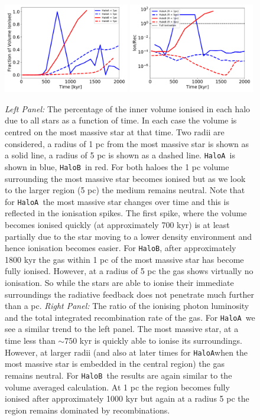 \documentclass[graphics, twocolumn, usenatbib]{mn2e}
\newcommand{\ha} {\texttt{HaloA~}}
\newcommand{\hb} {\texttt{HaloB~}}
\newcommand{\hac} {\texttt{HaloA}}
\newcommand{\hbc} {\texttt{HaloB}}
\begin{document}
\begin{figure}
\centering
\begin{minipage}{175mm}      \begin{center} 
\centerline{
\includegraphics[width=0.49\textwidth]{FIGURES/Ionisation.pdf}
\includegraphics[width=0.49\textwidth]{FIGURES/Recombination.pdf}}
\caption{\textit{Left Panel:} The percentage of the inner volume ionised in each halo
  due to all stars as a function of time. In each case the volume is centred on the
  most massive star at that time. Two radii are considered, a radius of 1 pc from the
  most massive star is shown as a solid line, a radius of 5 pc is shown as a
  dashed line. \ha is shown in blue, \hb in red. For both haloes the 1 pc volume surrounding the
  most massive star becomes ionised but as we look to the 
  larger region (5 pc) the medium remains neutral. Note that for \ha the
  most massive star changes over time and this is reflected in the ionisation spikes.
  The first spike, where the volume becomes ionised quickly (at approximately 700 kyr) is at
  least partially due to the star moving to a lower density environment and hence ionisation
  becomes easier. 
  For \hbc, after approximately 1800 kyr the gas within 1 pc of the most massive star has become
  fully ionised. However, at a radius of 5 pc the gas shows virtually no ionisation. So while the
  stars are able to ionise their immediate surroundings
  the radiative feedback does not penetrate much further than a pc. 
  \textit{Right Panel:} The ratio of the ionising photon luminosity and the total integrated
  recombination rate of the gas. For \ha we see a similar trend to the left panel. The most massive
  star, at a time less than $\sim 750$ kyr is quickly able to ionise its surroundings. However, at
  larger radii (and also at later times for \hac when the most massive star is embedded in the
  central region) the gas remains neutral. 
  For \hb the results are again similar to the volume averaged
  calculation. At 1 pc the region becomes fully ionised after approximately 1000 kyr but again
  at a radius 5 pc the region remains dominated by recombinations.
  }  \label{Fig:Ionisation}
\end{center} \end{minipage}


\end{figure}
\end{document}
